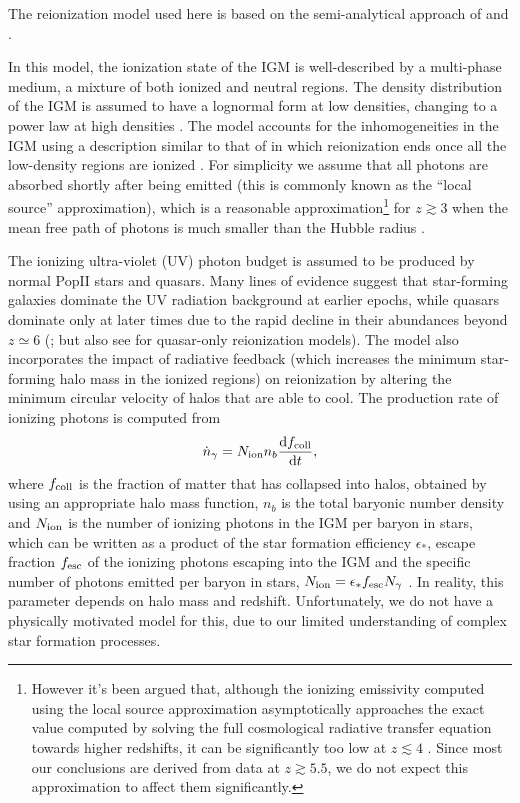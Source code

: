 \documentclass[useAMS,usenatbib]{mnras}
\newcommand{\be}{\begin{equation}}
\newcommand{\e}{\end{equation}}
\newcommand{\f}{\frac}
\newcommand{\de}{{\rm d}}
\begin{document}
The reionization model used here is based on the semi-analytical approach of
\cite{tirth05} and \cite{tirth06}.

In this model, the ionization state of the IGM is well-described by a 
multi-phase medium, a mixture of both ionized and neutral regions. The density 
distribution of the IGM is assumed to have a lognormal form at low 
densities, changing to a power law at high densities \citep{tirth05}.
The model accounts for the inhomogeneities in the IGM using a description 
similar to that of \citet{2000ApJ...530....1M} in which reionization ends 
once all the low-density regions are ionized \citep{tirth09}.
For simplicity we assume that all photons are absorbed shortly after
being emitted (this is commonly known as the ``local source'' approximation), 
which is a reasonable approximation\footnote{However it's been argued that,
although the ionizing emissivity computed using
the local source approximation asymptotically approaches the exact value computed by solving the full
cosmological radiative transfer equation towards higher redshifts, it can be significantly
too low at $z\lesssim4$ \citep{2013MNRAS.436.1023B}. Since most our conclusions are derived
from data at $z \gtrsim 5.5$, we do not expect this approximation to affect them significantly.}
for $z\gtrsim3$ when the mean free path of photons is much smaller than the Hubble radius
\citep{1999ApJ...514..648M,tirth09,2003ApJ...584..110S}.

The ionizing ultra-violet (UV) photon budget is assumed to be produced by normal PopII
stars and quasars. Many lines of evidence suggest that star-forming galaxies 
dominate the UV radiation background at earlier epochs, while quasars 
dominate only at later times due to the rapid decline in their abundances
beyond $z\simeq6$
(\citealt{2007ApJ...654..731H,2015ApJ...813L..35K,mitra5,2017MNRAS.468.4691D,2018MNRAS.473..227H};
but also see \citealt{2015ApJ...813L...8M,2016MNRAS.457.4051K} for quasar-only
reionization models).
The model also incorporates the impact of radiative feedback (which increases 
the minimum star-forming halo mass in the ionized regions) on reionization 
by altering the minimum circular velocity of halos that
are able to cool. The production rate of ionizing photons is computed from
\be
\dot{n}_{\gamma} = N_{\rm ion} n_b \f{\de f_{\rm coll}}{\de t},
\e
where $f_{\rm coll}$ is the fraction of matter that has collapsed into halos, 
obtained by using an appropriate halo
mass function, $n_b$ is the total  baryonic  number  density and $N_{\rm ion}$ is the number of
ionizing photons in the IGM per baryon in stars, which can be written as a product of the star formation
efficiency $\epsilon_*$, escape fraction $f_{\rm esc}$ of the ionizing photons 
escaping into the IGM and the specific
number of photons emitted per baryon in stars, $N_{\rm ion}=\epsilon_*f_{\rm esc}N_\gamma$ \citep{mitra3,mitra4}.
In reality, this parameter depends on halo mass and redshift. 
Unfortunately, we do not have a physically motivated model for this, due to 
our limited understanding of complex star formation processes.
\end{document}
